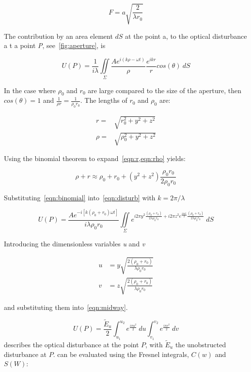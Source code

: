\begin{equation}
F = a\sqrt{\frac{2}{\lambda r_0}}
\label{eqn:fnumber}
\end{equation}

The contribution by an area element $dS$ at the point a, to the optical disturbance a t a point \textit{P}, see~\cref{fig:aperture}, is

\begin{equation}
U(P)=\frac{1}{i\lambda}\iint\limits_{\Sigma} \frac{Ae^{i(k\rho-\omega t)}}{\rho} \frac{e^{ikr}}{r}cos(\theta)\ dS
\label{eqn:disturb}
\end{equation}


In the case where $\rho_0$ and $r_0$ are large compared to the size of the aperture, then $cos(\theta) = 1$ and $\tfrac{1}{\rho r}=\tfrac{1}{\rho_0 r_0}$.
The lengths of $r_0$ and $\rho_0$ are:

\begin{align}
r=&\sqrt{r_0^2+y^2+z^2}\label{eqn:r} \\
\rho=&\sqrt{\rho_0^2+y^2+z^2}\label{eqn:rho}
\end{align}

Using the binomial theorem to expand~\cref{eqn:r,eqn:rho} yields:

\begin{equation}
\rho + r \approx \rho_0 + r_0 + (y^2+z^2)\frac{\rho_0r_0}{2\rho_0r_0}
\label{eqn:binomial}
\end{equation}

Substituting~\cref{eqn:binomial} into~\cref{eqn:disturb} with $k=2\pi/\lambda$

\begin{equation}
U(P)=\frac{Ae^{-i[k(\rho_0+r_0)\omega t]}}{i\lambda\rho_0r_0}\iint\limits_{\Sigma} e^{i2\pi y^2\tfrac{(\rho_0+r_0)}{2\lambda\rho_0r_0}+i2\pi z^2e^{\frac{i\pi u^2}{2}}\tfrac{(\rho_0+r_0)}{2\lambda\rho_0r_0}} \ dS
\label{eqn:midway}
\end{equation}


Introducing the dimensionless variables \textit{u} and \textit{v}

\begin{align}
u&=y\sqrt{\frac{2(\rho_0+r_0)}{\lambda\rho_0r_0}}\\
v&=z\sqrt{\frac{2(\rho_0+r_0)}{\lambda\rho_0r_0}}
\end{align}

and substituting them into~\cref{eqn:midway}.

\begin{equation}
U(P)=\frac{\tilde{E}_u}{2}\int_{u_1}^{u_2} e^{\tfrac{i\pi u^2}{2}}\ du\int_{v_1}^{v_2} e^{\tfrac{i\pi v^2}{2}} \ dv
\label{eqn:pentdisturb}
\end{equation}
 describes the optical disturbance at the point $P$, with $\tilde{E}_u$ the unobstructed disturbance at $P$.
 can be evaluated using the Fresnel integrals, $C(w)$ and $S(W)$:


